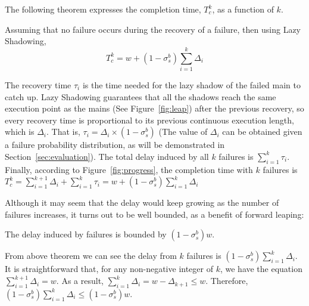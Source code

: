The following theorem expresses the completion time, $T_c^k$, as a function of $k$.

\begin{theorem}
Assuming that no failure occurs during the recovery of a failure, then using Lazy Shadowing, 
	$$T_c^k = w + (1-\sigma_s^b)\sum_{i=1}^k\Delta_i$$
\end{theorem}
\begin{IEEEproof}
The recovery time $\tau_i$ is the time needed for the lazy shadow of the failed main to catch up. Lazy Shadowing guarantees that all the shadows reach the same execution point as the mains (See Figure~\ref{fig:leap}) after the previous recovery, so every recovery time is proportional to its previous continuous execution length, which is $\Delta_i$. That is, $\tau_i = \Delta_i \times (1 - \sigma_s^b)$ (The value of $\Delta_i$ can be obtained given a failure probability distribution, as will be demonstrated in Section~\ref{sec:evaluation}). The total delay induced by all $k$ failures is $\sum_{i=1}^k\tau_i$.
Finally, according to Figure~\ref{fig:progress}, the completion time with $k$ failures is 
	$T_c^k = \sum_{i=1}^{k+1}\Delta_i + \sum_{i=1}^k\tau_i = w + (1-\sigma_s^b)\sum_{i=1}^k\Delta_i$
\end{IEEEproof}

Although it may seem that the delay would keep growing as the number of failures increases, 
it turns out to be well bounded, as a benefit of forward leaping: 

\begin{corollary}
The delay induced by failures is bounded by $(1-\sigma_s^b)w$.
\end{corollary}
\begin{IEEEproof}
From above theorem we can see the delay from $k$ failures is $(1-\sigma_s^b)\sum_{i=1}^k\Delta_i$. It is straightforward that, for any non-negative integer of $k$, we have the equation $\sum_{i=1}^{k+1}\Delta_i= w$. As a result, 
$\sum_{i=1}^{k}\Delta_i = w - \Delta_{k+1} \le w$. Therefore, $(1-\sigma_s^b)\sum_{i=1}^k\Delta_i \le (1-\sigma_s^b)w$.
\end{IEEEproof}

